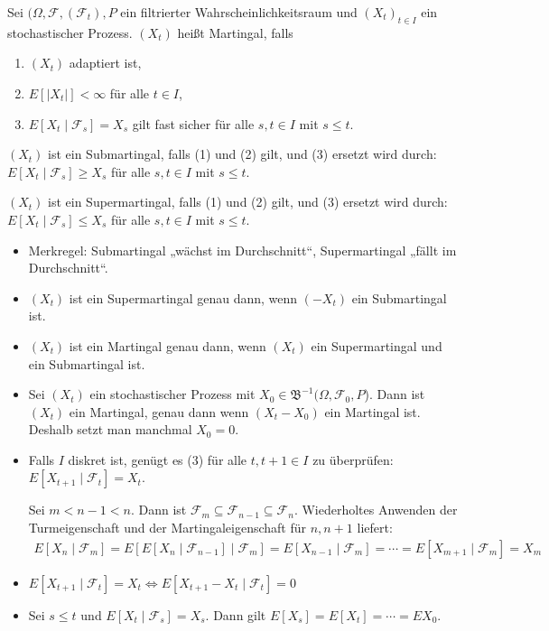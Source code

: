 \documentclass[a4paper,twoside,DIV15,BCOR12mm]{scrbook}
\newcommand{\cF}{\mathcal F}
\newcommand{\borel}{{\mathfrak B}}
\begin{document}
\begin{definition}
Sei $(\Omega, \cF, (\cF_t), P$ ein filtrierter Wahrscheinlichkeitsraum und $(X_t)_{t\in I}$ ein stochastischer Prozess. $(X_t)$ heißt Martingal, falls 
\begin{enumerate}
\item $(X_t)$ adaptiert ist,
\item $E[|X_t|] < \infty$ für alle $t\in I$,
\item $E[X_t\mid \cF_s] = X_s$ gilt fast sicher für alle $s,t\in I$ mit $s\le t$.
\end{enumerate}

$(X_t)$ ist ein Submartingal, falls (1) und (2) gilt, und (3) ersetzt wird durch: $E[X_t\mid \cF_s] \ge X_s$ für alle $s,t\in I$ mit $s\le t$.

$(X_t)$ ist ein Supermartingal, falls (1) und (2) gilt, und (3) ersetzt wird durch: $E[X_t\mid \cF_s] \le X_s$ für alle $s,t\in I$ mit $s\le t$.
\end{definition}

\begin{bemerkung}
\begin{itemize}
\item Merkregel: Su\rlap{\hspace{-1.1pt}\raisebox{5pt}{$\uparrow$}}bmartingal „wächst im Durchschnitt“, 
Su\rlap{\hspace{-1.1pt}\raisebox{-5pt}{$\downarrow$}}permartingal „fällt im Durchschnitt“. 
\item $(X_t)$ ist ein Supermartingal genau dann, wenn $(-X_t)$ ein Submartingal ist.
\item $(X_t)$ ist ein Martingal genau dann, wenn $(X_t)$ ein Supermartingal und ein Submartingal ist.
\item Sei $(X_t)$ ein stochastischer Prozess mit $X_0\in \borel^{-1}(\Omega, \cF_0, P$). Dann ist $(X_t)$ ein Martingal, genau dann wenn $(X_t-X_0)$ ein Martingal ist. Deshalb setzt man manchmal $X_0=0$.
\item Falls $I$ diskret ist, genügt es (3) für alle $t, t+1\in I$ zu überprüfen: $E[X_{t+1}\mid \cF_t] = X_t$.

\begin{beweis}
Sei $m< n-1 < n$. Dann ist $\cF_m \subseteq \cF_{n-1} \subseteq \cF_n$. Wiederholtes Anwenden der Turmeigenschaft und der Martingaleigenschaft für $n, n+1$ liefert:
\begin{align*}
E[X_n\mid\cF_m] = E[ E[X_n\mid \cF_{n-1}] \mid \cF_m] = E[ X_{n-1} \mid \cF_m] = \cdots = E[X_{m+1} \mid \cF_m] = X_m
\end{align*}
\end{beweis}
\item $E[X_{t+1} \mid \cF_t] = X_t \iff E[X_{t+1}-X_t \mid \cF_t] = 0$
\item Sei $s\le t$ und $E[X_t \mid \cF_s] = X_s$. Dann gilt $E[X_s] = E[X_t] = \cdots = EX_0$.
\end{itemize}
\end{bemerkung}
\end{document}
